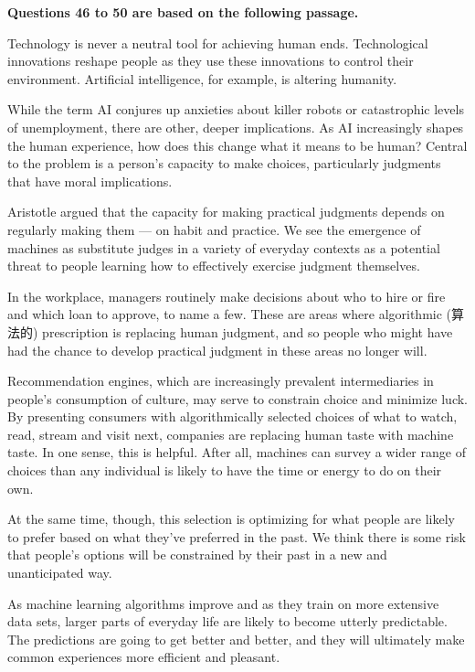 \documentclass[UTF8,11pt]{ctexart}
\begin{document}
\textbf{Questions 46 to 50 are based on the following passage.}


Technology is never a neutral tool for achieving human ends. Technological innovations reshape people as they use these innovations to control their environment. Artificial intelligence, for example, is altering humanity.


While the term AI conjures up anxieties about killer robots or catastrophic levels of unemployment, there are other, deeper implications. As AI increasingly shapes the human experience, how does this change what it means to be human? Central to the problem is a person’s capacity to make choices, particularly judgments that have moral implications.


Aristotle argued that the capacity for making practical judgments depends on regularly making them — on habit and practice. We see the emergence of machines as substitute judges in a variety of everyday contexts as a potential threat to people learning how to effectively exercise judgment themselves.


In the workplace, managers routinely make decisions about who to hire or fire and which loan to approve, to name a few. These are areas where algorithmic (算法的) prescription is replacing human judgment, and so people who might have had the chance to develop practical judgment in these areas no longer will.


Recommendation engines, which are increasingly prevalent intermediaries in people’s consumption of culture, may serve to constrain choice and minimize luck. By presenting consumers with algorithmically selected choices of what to watch, read, stream and visit next, companies are replacing human taste with machine taste. In one sense, this is helpful. After all, machines can survey a wider range of choices than any individual is likely to have the time or energy to do on their own.


At the same time, though, this selection is optimizing for what people are likely to prefer based on what they’ve preferred in the past. We think there is some risk that people’s options will be constrained by their past in a new and unanticipated way.


As machine learning algorithms improve and as they train on more extensive data sets, larger parts of everyday life are likely to become utterly predictable. The predictions are going to get better and better, and they will ultimately make common experiences more efficient and pleasant.
\end{document}

